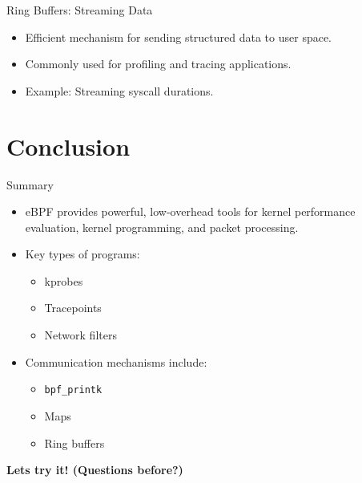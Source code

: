\documentclass{beamer}
\begin{document}
\begin{frame}{Ring Buffers: Streaming Data}
    \begin{itemize}
        \item Efficient mechanism for sending structured data to user space.
        \item Commonly used for profiling and tracing applications.
        \item Example: Streaming syscall durations.
    \end{itemize}
\end{frame}

\section*{Conclusion}
\begin{frame}{Summary}
    \begin{itemize}
        \item eBPF provides powerful, low-overhead tools for kernel performance
            evaluation, kernel programming, and packet processing.
        \item Key types of programs:
        \begin{itemize}
            \item kprobes
            \item Tracepoints
            \item Network filters
        \end{itemize}
        \item Communication mechanisms include:
        \begin{itemize}
            \item \texttt{bpf\_printk}
            \item Maps
            \item Ring buffers
        \end{itemize}
    \end{itemize}
    \centering
    \textbf{Lets try it! (Questions before?)}
\end{frame}
\end{document}
